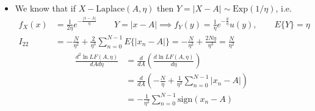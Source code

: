 \begin{itemize}
\begin{align*}
I_{11} &= -E\left\{ \frac{d^2 \ln LF(A, \eta)}{dA^2} \right\}
= -E\left\{ -\frac{2}{\eta} \sum_{n=0}^{N-1} \delta(x_n - A) \right\}
= \frac{2}{\eta} \sum_{n=0}^{N-1} \left[
    \int_{-\infty}^{+\infty} \delta(x_n - A) f_X(x_n) dx_n
\right]\\
&= \frac{2}{\eta} \sum_{n=0}^{N-1} f_X(A)
= \frac{2N}{\eta} f_X(A)
= \frac{2N}{\eta} \cdot \frac{1}{2\eta}
= \frac{N}{\eta^2}
\end{align*}
\begin{align*}
\frac{d^2 \ln LF(A, \eta)}{d \eta^2}
&= \frac{d}{d \eta} \left( \frac{d \ln LF(A, \eta)}{d \eta} \right)
= \frac{d}{d \eta}
\left( -\frac{N}{\eta} + \frac{1}{\eta^2} \sum_{n=0}^{N-1} |x_n - A| \right)\\
&= \frac{N}{\eta^2} - \frac{2}{\eta^3} \sum_{n=0}^{N-1} |x_n - A|\\
I_{22} &= -E\left\{ \frac{d^2 \ln LF(A, \eta)}{d \eta^2} \right\}
= -\frac{N}{\eta^2} + \frac{2}{\eta^3} \sum_{n=0}^{N-1} E\left\{ |x_n - A| \right\}
\end{align*}

\item We know that if \(X-\text{Laplace}(A,\eta)\) then \(Y = |X-A|\sim \text{Exp}(1/\eta)\), i.e.
\begin{align*}
f_X(x) &= \frac{1}{2\eta} e^{-\frac{|x - A|}{\eta}}
\qquad
Y = |x - A|
\implies
f_Y(y) = \frac{1}{\eta} e^{-\frac{y}{\eta}} u(y),\qquad E\{Y\} = \eta\\
I_{22} &= -\frac{N}{\eta^2}
+ \frac{2}{\eta^3} \sum_{n=0}^{N-1} E\{|x_n - A|\}
= -\frac{N}{\eta^2}
+ \frac{2N\eta}{\eta^3}
= \frac{N}{\eta^2}
\end{align*}
\begin{align*}
\frac{d^2 \ln LF(A,\eta)}{dA d\eta}
&= \frac{d}{dA} \left( \frac{d \ln LF(A,\eta)}{d\eta} \right) \\
&= \frac{d}{dA} \left(-\frac{N}{\eta} + \frac{1}{\eta^2} \sum_{n=0}^{N-1} |x_n - A| \right) \\
&= -\frac{1}{\eta^2} \sum_{n=0}^{N-1} \mathrm{sign}(x_n - A)
\end{align*}


\end{itemize}
